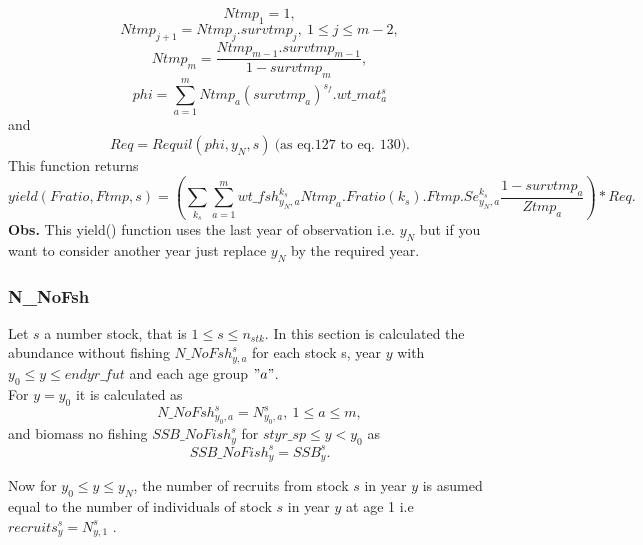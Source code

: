 \documentclass{article}
\begin{document}
\begin{equation}
    Ntmp_1=1,
\end{equation}
\begin{equation}
    Ntmp_{j+1}=Ntmp_j.survtmp_j, \ 1\leq j \leq m-2,
\end{equation}
\begin{equation}
    Ntmp_m=\dfrac{Ntmp_{m-1}.survtmp_{m-1}}{1-survtmp_m},
\end{equation}
\begin{equation}
    phi=\sum_{a=1}^m Ntmp_a(survtmp_a)^{s_f}.wt\_mat^s_a
\end{equation}
and
\begin{equation}
    Req=Requil(phi,y_N,s) \  \text{(as eq.127 to eq. 130)}.
\end{equation}
This function returns
\begin{equation}
    yield(Fratio, Ftmp,s)=\left(\sum_{k_s}\sum_{a=1}^m wt\_fsh^{k_s}_{y_N,a}Ntmp_a.Fratio(k_s).Ftmp.Se^{k_s}_{y_N,a}\dfrac{1-survtmp_a}{Ztmp_a}\right)*Req.
\end{equation}
\textbf{Obs.} This yield() function uses the last year of observation i.e. $y_N$ but if you want to consider another year just replace $y_N$ by the required year.\\

\subsubsection{N\_NoFsh}
Let $s$ a number stock,  that is $1\leq s \leq n_{stk}$. In this section is calculated the abundance without fishing $N\_NoFsh^s_{y,a}$ for each stock s, year $y$ with $y_0\leq y \leq endyr\_fut$ and each age group $"a"$. \\

For $y=y_0$ it is calculated as 
\begin{equation}
N\_NoFsh^s_{y_0,a}=N^s_{y_0,a}, \ 1\leq a \leq m,
\end{equation}
and biomass no fishing  $SSB\_NoFish^s_y$ for $styr\_sp \leq y < y_0$ as
\begin{equation}
    SSB\_NoFish^s_y=SSB^s_{y}.
\end{equation}


Now for $y_0\leq y \leq y_N$, the number of recruits from stock $s$ in year $y$ is asumed equal to the number of individuals of stock $s$ in year $y$ at age 1 i.e $recruits^s_y=N^s_{y,1}$ .\\ 
\end{document}
